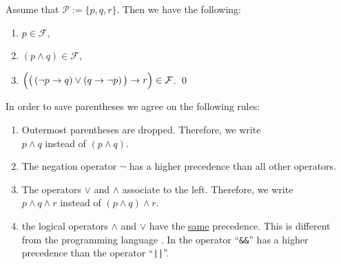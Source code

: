 \exampleEng 
Assume that $\mathcal{P} := \{ p, q, r \}$. Then we have the following:
\begin{enumerate}
\item $p \in \mathcal{F}$,
\item $(p \wedge q) \in \mathcal{F}$,
\item $\Bigl(\bigl(\,(\neg p \rightarrow q) \vee (q \rightarrow \neg p)\,\bigr) \rightarrow r\Bigr) \in \mathcal{F}$.  \qed
\end{enumerate}

\noindent
In order to save parentheses we agree on the following rules:
\begin{enumerate}
\item Outermost parentheses are dropped.  Therefore, we write \\[0.2cm]
      \hspace*{1.3cm} $p \wedge q$ \quad instead of \quad $(p \wedge q)$.
\item The negation operator $\neg$ has a higher precedence than all other operators. 
\item The operators  $\vee$ and $\wedge$ associate to the left.  Therefore, we write 
      \\[0.2cm]
      \hspace*{1.3cm} $p \wedge q \wedge r$ \quad instead of \quad $(p \wedge q) \wedge r$.
\item \underline{\textbf{}} the logical operators 
      $\wedge$ and $\vee$ have the \underline{same} precedence.  This is different from the programming
      language  \Fsharp.  In \Fsharp{} the operator ``\texttt{\&\&}'' has a higher precedence than
      the  operator ``\texttt{||}''.
      

\end{enumerate}
